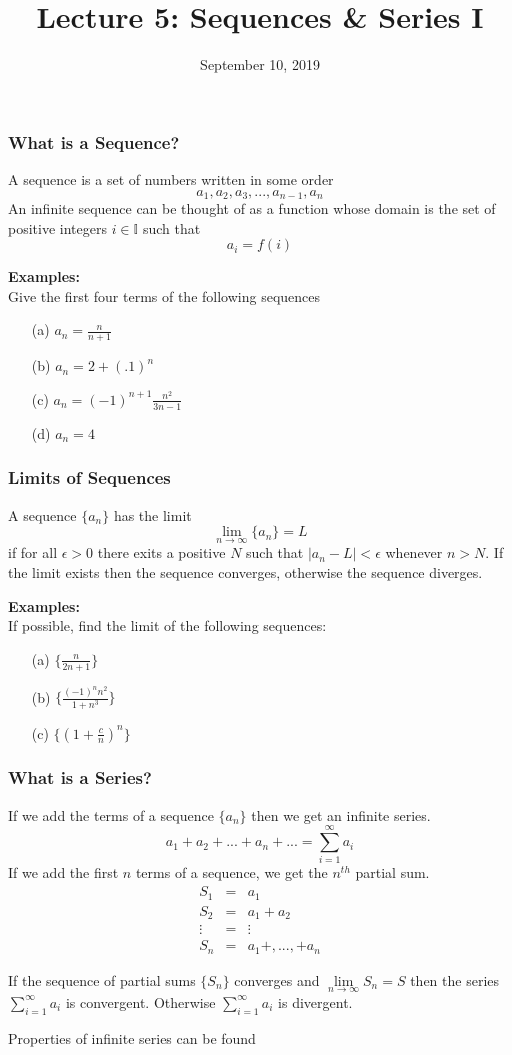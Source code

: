 \documentclass{beamer}
\title{Lecture 5: Sequences \& Series I}
\date{September 10, 2019}
\begin{document}
	
\frame{\titlepage}

\begin{frame}
\frametitle{What is a Sequence?}
A sequence is a set of numbers written in some order
$$a_1, a_2, a_3,...,a_{n-1}, a_n$$
An infinite sequence can be thought of as a function whose domain is the set of positive integers $i \in \mathbb{I}$ such that
$$a_i = f(i)$$

\vspace{6pt}
\textbf{Examples:}\\
Give the first four terms of the following sequences
\begin{itemize}
	\item[(a)] $a_n = \frac{n}{n+1}$
	\item[(b)] $a_n = 2 + (.1)^n$
	\item[(c)] $a_n = (-1)^{n+1} \frac{n^2}{3n-1}$
	\item[(d)] $a_n = 4$
\end{itemize}
\end{frame}

\begin{frame}
\frametitle{Limits of Sequences}
A sequence $\{a_n\}$ has the limit
$$\lim\limits_{n \to \infty} \{a_n\} = L$$
if for all $\epsilon > 0$ there exits a positive $N$ such that $|a_n-L| < \epsilon$ whenever $n>N$. If the limit exists then the sequence converges, otherwise the sequence diverges.

\vspace{6pt}
\textbf{Examples:}\\
If possible, find the limit of the following sequences:
\begin{itemize}
	\item[(a)] $\{\frac{n}{2n+1}\}$
	\item[(b)] $\{ \frac{(-1)^nn^2}{1+n^3}\}$
	\item[(c)] $\{(1+\frac{c}{n})^n\}$
\end{itemize}
\end{frame}

\begin{frame}
\frametitle{What is a Series?}
If we add the terms of a sequence $\{a_n\}$ then we get an infinite series.
$$a_1+a_2+...+a_n+... = \sum_{i=1}^\infty a_i$$
If we add the first $n$ terms of a sequence, we get the $n^{th}$ partial sum.
\begin{eqnarray*}
	S_1 &=& a_1 \\
	S_2 &=& a_1 + a_2\\
	\vdots &=& \vdots\\
	S_n &=& a_1 +,...,+a_n
\end{eqnarray*}

If the sequence of partial sums $\{S_n\}$ converges and $\lim\limits_{n \to \infty}S_n=S$ then the series $\sum_{i=1}^{\infty} a_i$ is convergent. Otherwise  $\sum_{i=1}^{\infty} a_i$ is divergent.

Properties of infinite series can be found 
\end{frame}
\end{document}
